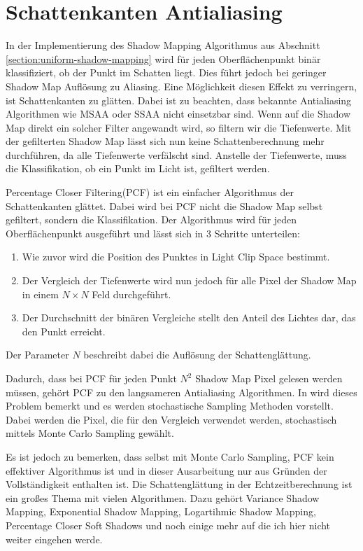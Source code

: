 \section{Schattenkanten Antialiasing}
\label{section:pcf}
In der Implementierung des Shadow Mapping Algorithmus aus Abschnitt \ref{section:uniform-shadow-mapping} wird für jeden Oberflächenpunkt 
binär klassifiziert, ob der Punkt im Schatten liegt. Dies führt jedoch bei geringer Shadow Map Auflösung zu Aliasing.
Eine Möglichkeit diesen Effekt zu verringern, ist Schattenkanten zu glätten.
Dabei ist zu beachten, dass bekannte Antialiasing Algorithmen wie MSAA oder SSAA nicht einsetzbar sind.
Wenn auf die Shadow Map direkt ein solcher Filter angewandt wird, so filtern wir die Tiefenwerte.
Mit der gefilterten Shadow Map lässt sich nun keine Schattenberechnung mehr durchführen, da alle Tiefenwerte 
verfälscht sind.
Anstelle der Tiefenwerte, muss die Klassifikation, ob ein Punkt im Licht ist, gefiltert werden.
\par
Percentage Closer Filtering(PCF) \cite{PCF1987} ist ein einfacher Algorithmus der Schattenkanten glättet.
Dabei wird bei PCF nicht die Shadow Map selbst gefiltert, sondern die Klassifikation.
Der Algorithmus wird für jeden Oberflächenpunkt ausgeführt und lässt sich in 3 Schritte unterteilen:
\begin{enumerate}
  \item Wie zuvor wird die Position des Punktes in Light Clip Space bestimmt.
  \item Der Vergleich der Tiefenwerte wird nun jedoch für alle Pixel der Shadow Map in einem $N\times{}N$ Feld durchgeführt.
  \item Der Durchschnitt der binären Vergleiche stellt den Anteil des Lichtes dar, das den Punkt erreicht.
\end{enumerate}
\par
Der Parameter $N$ beschreibt dabei die Auflösung der Schattenglättung.
\par
Dadurch, dass bei PCF für jeden Punkt $N^2$ Shadow Map Pixel gelesen werden müssen, gehört PCF zu den 
langsameren Antialiasing Algorithmen.
In \cite{PCF1987} wird dieses Problem bemerkt und es werden stochastische Sampling Methoden vorstellt.
Dabei werden die Pixel, die für den Vergleich verwendet werden, stochastisch mittels Monte Carlo Sampling gewählt.
\par
Es ist jedoch zu bemerken, dass selbst mit Monte Carlo Sampling, PCF kein effektiver Algorithmus ist und
in dieser Ausarbeitung nur aus Gründen der Vollständigkeit enthalten ist. 
Die Schattenglättung in der Echtzeitberechnung ist ein großes Thema mit vielen Algorithmen. 
Dazu gehört Variance Shadow Mapping, Exponential Shadow Mapping, Logartihmic Shadow Mapping,
Percentage Closer Soft Shadows und noch einige mehr auf die ich hier nicht weiter eingehen werde.

